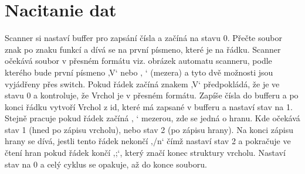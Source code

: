 \section{Nacitanie dat}
Scanner si nastaví buffer pro zapsání čísla a začíná na stavu 0. Přečte soubor znak po znaku funkcí a dívá se na první písmeno, které je na řádku. Scanner očekává soubor v přesném formátu viz. obrázek automatu scanneru, podle kterého bude první písmeno ‚V‘ nebo ‚ ‘ (mezera) a tyto dvě možnosti jsou vyjádřeny přes switch. Pokud řádek začíná znakem ‚V‘ předpokládá, že je ve stavu 0 a kontroluje, že Vrchol je v přesném formátu. Zapíše čísla do bufferu a po konci řádku vytvoří Vrchol z id, které má zapsané v bufferu a nastaví stav na 1. Stejně pracuje pokud řádek začíná ‚ ‘ mezerou, zde se jedná o hranu. Kde očekává stav 1 (hned po zápisu vrcholu), nebo stav 2 (po zápisu hrany). Na konci zápisu hrany se dívá, jestli tento řádek nekončí ‚/n‘ čímž nastaví stav 2 a pokračuje ve čtení hran pokud řádek končí ‚;‘, který značí konec struktury vrcholu. Nastaví stav na 0 a celý cyklus se opakuje, až do konce souboru. 

\newpage
